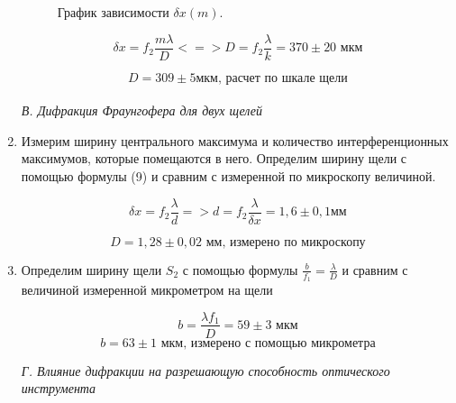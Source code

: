 \documentclass[a4paper, 12pt]{article}%
\begin{document}
\begin{enumerate}
\begin{figure}[H]
 	\caption{График зависимости $\delta x (m)$.}
\end{figure}

$$ \delta x = f_2 \frac{m\lambda}{D} <=> D = f_2 \frac{\lambda}{k} = 370 \pm 20\text{ мкм} $$


$$ D = 309 \pm 5 \text{мкм, расчет по шкале щели} $$\\


\textit{В. Дифракция Фраунгофера для двух щелей}\\

\item Измерим ширину центрального максимума и количество интерференционных максимумов, которые помещаются в него. Определим ширину щели с помощью формулы (9) и сравним с измеренной по микроскопу величиной.

$$ \delta x = f_2 \frac{\lambda}{d} => d = f_2 \frac{\lambda}{\delta x}  = 1,6 \pm 0,1 \text{мм}$$

$$ D = 1,28 \pm 0,02 \text{ мм, измерено по микроскопу} $$

\item Определим ширину щели $S_2$ с помощью формулы $ \frac{b}{f_1} = \frac{\lambda}{D}$ и сравним с величиной измеренной микрометром на щели

$$ b = \frac{\lambda f_1}{D} = 59 \pm 3 \text{ мкм}$$
$$ b = 63 \pm 1 \text{ мкм, измерено с помощью микрометра}$$


\textit{Г. Влияние дифракции на разрешающую способность оптического инструмента}\\


\end{enumerate}
\end{document}
